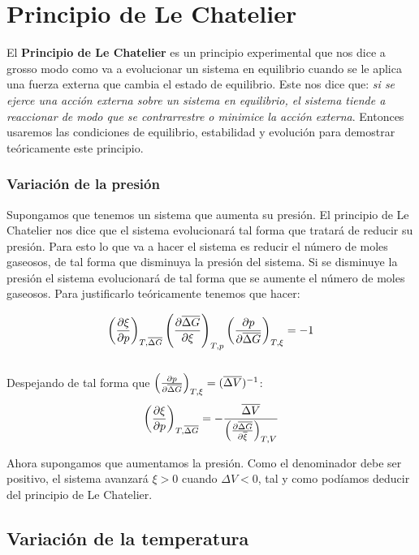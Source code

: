\documentclass[12pt,a4paper,oneside]{book}
\begin{document}
\section{Principio de Le Chatelier}

El \textbf{Principio de Le Chatelier} es un principio experimental que nos dice a grosso modo como va a evolucionar un sistema en equilibrio cuando se le aplica una fuerza externa que cambia el estado de equilibrio. Este nos dice que: \textit{si se ejerce una acción externa sobre un sistema en equilibrio, el sistema tiende a reaccionar de modo que se contrarrestre o minimice la acción externa}. Entonces usaremos las condiciones de equilibrio, estabilidad y evolución para demostrar teóricamente este principio.

\subsubsection*{Variación de la presión}

Supongamos que tenemos un sistema que aumenta su presión. El principio de Le Chatelier nos  dice que el sistema evolucionará tal forma que tratará de reducir su presión. Para esto lo que va a hacer el sistema es reducir el número de moles gaseosos, de tal forma que disminuya la presión del sistema. Si se disminuye la presión el sistema evolucionará de tal forma que se aumente el número de moles gaseosos. Para justificarlo teóricamente tenemos que hacer:

$$ \left( \frac{\partial \xi}{\partial p} \right)_{T, \overline{\Delta G}}  \left( \frac{\partial \overline{\Delta G}}{\partial \xi} \right)_{T,p} \left( \frac{\partial p}{\partial \overline{\Delta G}} \right)_{T,\xi} = - 1  $$ \\


Despejando de tal forma que $\left( \frac{\partial p}{\partial \overline{\Delta G}} \right)_{T,\xi} = (\overline{\Delta V})^{-1}$: \\

\begin{equation}
\left( \frac{\partial \xi}{\partial p} \right)_{T,\overline{\Delta G}} = -  \dfrac{\overline{\Delta V}}{\left( \frac{\partial \overline{\Delta G}}{\partial \overline{\xi}} \right)_{T,V}}
\end{equation}

Ahora supongamos que aumentamos la presión. Como el denominador debe ser positivo, el sistema avanzará $\xi >0$ cuando $\Delta V < 0$, tal y como podíamos deducir del principio de Le Chatelier. 

\subsection*{Variación de la temperatura}
\end{document}
